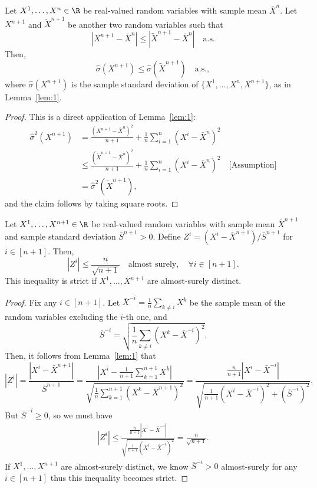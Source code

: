 \begin{lemma}\label{lem:2}
    Let $X^1,\ldots, X^n \in \R$ be real-valued random variables with sample mean $\bar{X}^n$. Let $X^{n+1}$ and $\tilde{X}^{n+1}$ be another two random variables such that
    \[
    |X^{n+1} - \bar{X}^n| \leq |\tilde{X}^{n+1}-\bar{X}^n| \quad \text{a.s.}
    \]
    Then,
    \[
    \hat{\sigma}(X^{n+1}) \leq \hat{\sigma}(\tilde{X}^{n+1}) \quad \text{a.s.},
    \]
    where $\hat{\sigma}(X^{n+1})$ is the sample standard deviation of $\{X^1,\ldots,X^n, X^{n+1}\}$, as in Lemma~\ref{lem:1}.
\end{lemma}
\begin{proof}
    This is a direct application of Lemma~\ref{lem:1}:
\begin{align*}
    \hat{\sigma}^2(X^{n+1}) 
    &= \frac{(X^{n+1}-\bar{X}^{n})^2}{n+1}+\frac{1}{n}\sum^n_{i=1}(X^i-\bar{X}^{n})^2\\
    &\leq \frac{(\tilde{X}^{n+1}-\bar{X}^{n})^2}{n+1}+\frac{1}{n}\sum^n_{i=1}(X^i-\bar{X}^{n})^2 \quad \text{[Assumption]}\\
    &=\hat{\sigma}^2(\tilde{X}^{n+1}),
\end{align*}
and the claim follows by taking square roots.
\end{proof}


\begin{lemma}\label{lem:3}
    Let $X^1,\ldots, X^{n+1} \in \R$ be real-valued random variables with sample mean $\bar{X}^{n+1}$ and sample standard deviation $\bar{S}^{n+1} > 0$. Define $Z^i = (X^i-\bar{X}^{n+1}) / \bar{S}^{n+1}$ for $i \in [n+1]$. Then,
    \[
    |Z^i| \leq \frac{n}{\sqrt{n+1}} \quad\text{almost surely}, \quad \forall i \in [n+1].
    \]
    This inequality is strict if $X^1,\ldots,X^{n+1}$ are almost-surely distinct.
\end{lemma}
\begin{proof}
Fix any $i\in [n+1]$.
Let $\bar{X}^{-i} = \frac{1}{n}\sum_{k\neq i}X^k$ be the sample mean of the random variables excluding the $i$-th one, and
\[
\bar{S}^{-i} = \sqrt{\frac{1}{n}\sum_{k\neq i}(X^k - \bar{X}^{-i})^2}.
\]
Then, it follows from Lemma~\ref{lem:1} that
\[
|Z^i| = \frac{|X^i-\bar{X}^{n+1}|}{\bar{S}^{n+1}}
    = \frac{\left|X^i - \frac{1}{n+1}\sum^{n+1}_{k=1}X^k\right|}{\sqrt{\frac{1}{n}\sum^{n+1}_{k=1}(X^k - \bar{X}^{n+1})^2}}=\frac{\frac{n}{n+1}|X^i - \bar{X}^{-i}|}{\sqrt{\frac{1}{n+1}(X^i-\bar{X}^{-i})^2+(\bar{S}^{-i})^2}}.
\]
But $\bar{S}^{-i} \geq 0$, so we must have
\begin{align*}
    |Z^i|\leq \frac{\frac{n}{n+1}|X^i - \bar{X}^{-i}|}{\sqrt{\frac{1}{n+1}(X^i-\bar{X}^{-i})^2}}= \frac{n}{\sqrt{n+1}}.
\end{align*}
If $X^1,\ldots,X^{n+1}$ are almost-surely distinct, we know $\bar{S}^{-i} >0$ almost-surely for any $i \in [n+1]$ thus this inequality becomes strict.
\end{proof}



